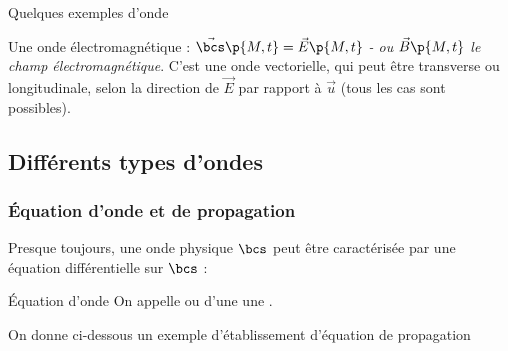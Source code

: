\begin{example}{Quelques exemples d'onde}{}
\begin{center}
        \end{center}
        \begin{enumerate}
            \itt Une onde électromagnétique : $\vec\bcs\p{M,t} = \vec E\p{M,t}$ \emph{- ou $\vec B\p{M,t}$ le champ électromagnétique}. C'est une onde vectorielle, qui peut être transverse ou longitudinale, selon la direction de $\vec{E}$ par rapport à $\vec{u}$ (tous les cas sont possibles).
       \end{enumerate}
    \end{example}
    
    \subsection{Différents types d'ondes}

    \subsubsection{Équation d'onde et de propagation}
    
    Presque toujours, une onde physique $\bcs$ peut être caractérisée par une équation différentielle sur $\bcs$ :

    \begin{definition}{Équation d'onde}{}
        On appelle  ou  d'une  une .
    \end{definition}
    
    On donne ci-dessous un exemple d'établissement d'équation de propagation
    
